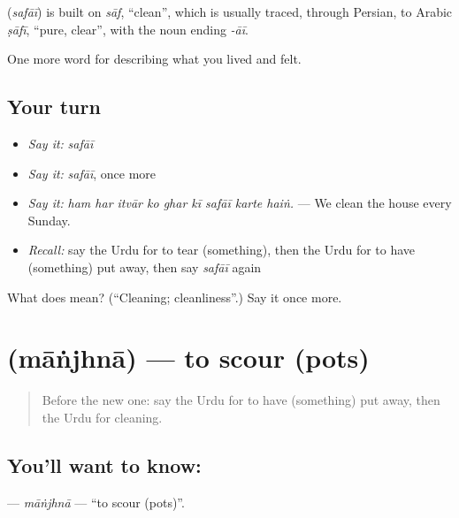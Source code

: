 \begin{cousinweb}
\textbf{} (\emph{safāī}) is built on \emph{sāf}, \textquotedblleft{}clean\textquotedblright{}, which is usually traced, through Persian, to Arabic \emph{ṣāfī}, \textquotedblleft{}pure, clear\textquotedblright{}, with the noun ending \emph{-āī}.
\end{cousinweb}

\begin{grammarlens}[title={What you've built}]
One more word for describing what you lived and felt.
\end{grammarlens}

\subsection*{Your turn}
\begin{itemize}
\raggedright
  \item \emph{Say it:} \emph{safāī}
  \item \emph{Say it:} \emph{safāī}, once more
  \item \emph{Say it:} \emph{ham har itvār ko ghar kī safāī karte haiṅ.} — We clean the house every Sunday.
  \item \emph{Recall:} say the Urdu for to tear (something), then the Urdu for to have (something) put away, then say \emph{safāī} again
\end{itemize}

\begin{tcolorbox}[breakable,colback=teal!4,colframe=teal!35!black,title={Before you move on}]
What does  mean? (\textquotedblleft{}Cleaning; cleanliness\textquotedblright{}.) Say it once more.
\end{tcolorbox}
\section[\texorpdfstring{\ur{مانجھنا} (māṅjhnā)}{مانجھنا (māṅjhnā)}]{ (māṅjhnā) — to scour (pots)}

\label{lesson:UR-C506-manjhna}



\begin{quote}
Before the new one: say the Urdu for to have (something) put away, then the Urdu for cleaning.
\end{quote}

\subsection*{You'll want to know: }
\textbf{} — \emph{māṅjhnā} — \textquotedblleft{}to scour (pots)\textquotedblright{}.

